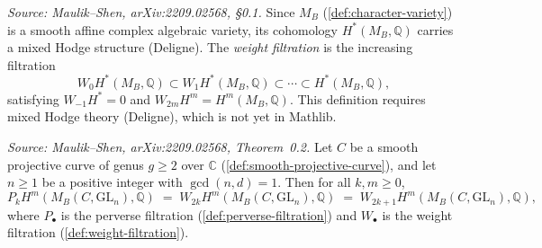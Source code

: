 \begin{definition}[WeightFiltration]
  \label{def:weight-filtration}
  \textit{Source: Maulik--Shen, arXiv:2209.02568, §0.1.}
  Since $M_B$ (\cref{def:character-variety}) is a smooth affine complex algebraic variety,
  its cohomology $H^*(M_B, \mathbb{Q})$ carries a mixed Hodge structure (Deligne).  The
  \emph{weight filtration} is the increasing filtration
  \[
    W_0 H^*(M_B, \mathbb{Q}) \subset W_1 H^*(M_B, \mathbb{Q})
    \subset \cdots \subset H^*(M_B, \mathbb{Q}),
  \]
  satisfying $W_{-1} H^* = 0$ and $W_{2m} H^m = H^m(M_B, \mathbb{Q})$.  This definition
  requires mixed Hodge theory (Deligne), which is not yet in Mathlib.
\end{definition}

\begin{theorem}[$P=W$ for $\mathrm{GL}_n$]
  \label{thm:pw-main}
  \textit{Source: Maulik--Shen, arXiv:2209.02568, Theorem~0.2.}
  Let $C$ be a smooth projective curve of genus $g \geq 2$ over $\mathbb{C}$
  (\cref{def:smooth-projective-curve}), and let $n \geq 1$ be a positive integer with
  $\gcd(n, d) = 1$.  Then for all $k, m \geq 0$,
  \[
    P_k H^m(M_B(C, \mathrm{GL}_n), \mathbb{Q})
    \;=\; W_{2k} H^m(M_B(C, \mathrm{GL}_n), \mathbb{Q})
    \;=\; W_{2k+1} H^m(M_B(C, \mathrm{GL}_n), \mathbb{Q}),
  \]
  where $P_\bullet$ is the perverse filtration (\cref{def:perverse-filtration}) and
  $W_\bullet$ is the weight filtration (\cref{def:weight-filtration}).
\end{theorem}

